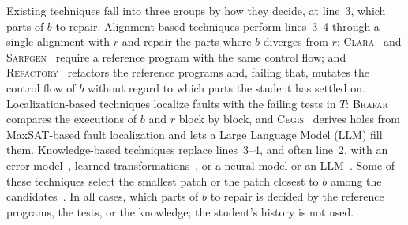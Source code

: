 \documentclass[10pt,conference]{IEEEtran}
\begin{document}
Existing techniques fall into three groups by how they decide, at line~3, which parts of $b$ to repair. Alignment-based techniques perform lines~3--4 through a single alignment with $r$ and repair the parts where $b$ diverges from $r$: \textsc{Clara}~\cite{gulwani2018automated} and \textsc{Sarfgen}~\cite{wang2018search} require a reference program with the same control flow; and \textsc{Refactory}~\cite{hu2019re} refactors the reference programs and, failing that, mutates the control flow of $b$ without regard to which parts the student has settled on. Localization-based techniques localize faults with the failing tests in $T$: \textsc{Brafar}~\cite{xie2024brafar} compares the executions of $b$ and $r$ block by block, and \textsc{Cegis}~\cite{orvalho2025counterexample} derives holes from MaxSAT-based fault localization and lets a Large Language Model (LLM) fill them. Knowledge-based techniques replace lines~3--4, and often line~2, with an error model~\cite{singh2013automated}, learned transformations~\cite{rolim2017learning}, or a neural model or an LLM~\cite{heo2023referent, zhang2024pydex, zhao2026peer, dai2026learner}. Some of these techniques select the smallest patch or the patch closest to $b$ among the candidates~\cite{gulwani2018automated, wang2018search, ahmed2022verifix, d2016qlose, zhang2024pydex}. In all cases, which parts of $b$ to repair is decided by the reference programs, the tests, or the knowledge; the student's history is not used.
\end{document}
